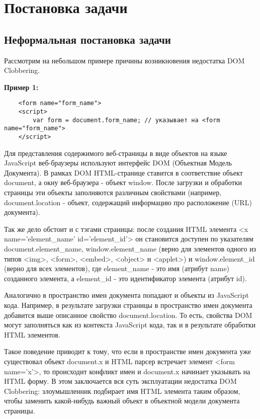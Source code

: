 
\chapter{Постановка задачи}\label{Introduction}

\section{Неформальная постановка задачи}

Рассмотрим на небольшом примере причины возникновения недостатка DOM Clobbering.

\bigskip
\textbf{Пример 1:}

\begin{lstlisting}
	<form name="form_name">
	<script>
		var form = document.form_name; // указывает на <form name="form_name">
	</script>
\end{lstlisting}
\bigskip




Для представления содержимого веб-страницы в виде объектов на языке JavaScript веб-браузеры используют интерфейс DOM (Объектная Модель Документа). В рамках DOM HTML-странице ставится в соответствие объект document, а окну веб-браузера - объект window. После загрузки и обработки страницы эти объекты заполняются различным свойствами (например, document.location - объект, содержащий информацию про расположение (URL) документа).


Так же дело обстоит и с тэгами страницы: после создания HTML элемента <x name='element\_name' id='element\_id'> он становится доступен по указателям document.element\_name, window.element\_name (верно для элементов одного из типов <img>, <form>, <embed>, <object> и <applet>) и window.element\_id (верно для всех элементов), где element\_name - это имя (атрибут name) созданного элемента, а element\_id - это идентификатор элемента (атрибут id).



Аналогично в пространство имен документа попадают и объекты из JavaScript кода. Например, в результате загрузки страницы в пространство имен документа добавится выше описанное свойство document.location. То есть, свойства DOM могут заполняться как из контекста JavaScript кода, так и в результате обработки HTML элементов.


Такое поведение приводит к тому, что если в пространстве имен документа уже существовал объект document.x и HTML парсер встречает элемент <form name='x'>, то происходит конфликт имен и document.x начинает указывать на HTML форму. В этом заключается вся суть эксплуатации недостатка DOM Clobbering: злоумышленник подбирает имя HTML элемента таким образом, чтобы заменить какой-нибудь важный объект в объектной модели документа страницы.


